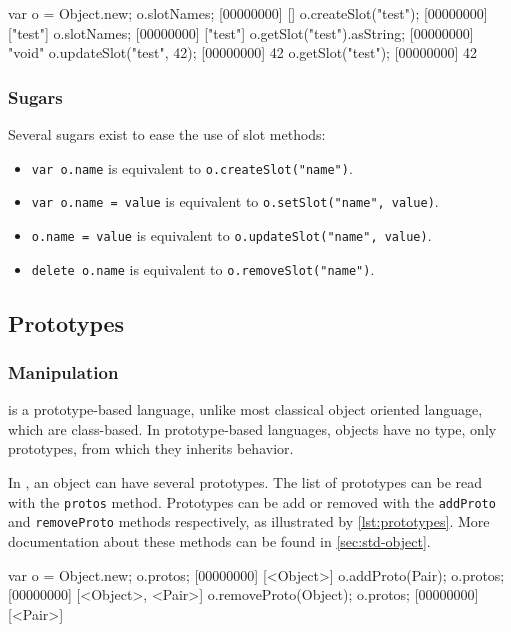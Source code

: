 \begin{urbiscript}[caption=Manipulating slots, label=lst:slots,
  float=\floatpos]
var o = Object.new;
o.slotNames;
[00000000] []
o.createSlot("test");
[00000000] ["test"]
o.slotNames;
[00000000] ["test"]
o.getSlot("test").asString;
[00000000] "void"
o.updateSlot("test", 42);
[00000000] 42
o.getSlot("test");
[00000000] 42
\end{urbiscript}

\subsubsection{Sugars}

Several sugars exist to ease the use of slot methods:

\begin{itemize}
\item \lstinline|var o.name| is equivalent to
  \lstinline|o.createSlot("name")|.
\item \lstinline|var o.name = value| is equivalent to
  \lstinline|o.setSlot("name", value)|.
\item \lstinline|o.name = value| is equivalent to
  \lstinline|o.updateSlot("name", value)|.
\item \lstinline|delete o.name| is equivalent to
  \lstinline|o.removeSlot("name")|.
\end{itemize}


\subsection{Prototypes}

\subsubsection{Manipulation}

\us is a prototype-based language, unlike most classical object
oriented language, which are class-based. In prototype-based
languages, objects have no type, only prototypes, from which they
inherits behavior.

In \us, an object can have several prototypes. The list of prototypes
can be read with the \lstinline|protos| method. Prototypes can be add
or removed with the \lstinline|addProto| and \lstinline|removeProto|
methods respectively, as illustrated by \autoref{lst:prototypes}. More
documentation about these methods can be found in \autoref{sec:std-object}.

\begin{urbiscript}[caption=Manipulating prototypes, label=lst:prototypes,
  float=\floatpos]
var o = Object.new;
o.protos;
[00000000] [<Object>]
o.addProto(Pair);
o.protos;
[00000000] [<Object>, <Pair>]
o.removeProto(Object);
o.protos;
[00000000] [<Pair>]
\end{urbiscript}


